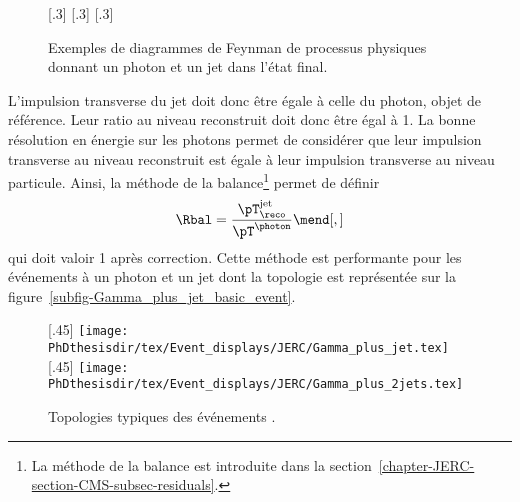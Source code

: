 \begin{figure}[h]
\centering\vspace{\baselineskip}
\subcaptionbox{\label{subfig-fgraph-gq_qGamma_S}}[.3\textwidth]
{\vspace{\baselineskip}}
\hfill
\subcaptionbox{\label{subfig-fgraph-gq_qGamma_T}}[.3\textwidth]
{\vspace{\baselineskip}}
\hfill
\subcaptionbox{\label{subfig-fgraph-qq_gGamma}}[.3\textwidth]
{\vspace{\baselineskip}}
\caption[Diagrammes de Feynman donnant un photon et un jet dans l'état final.]{Exemples de diagrammes de Feynman de processus physiques donnant un photon et un jet dans l'état final.}
\label{fig-fgraph-gamma_plus_jets}
\end{figure}
\par L'impulsion transverse du jet doit donc être égale à celle du photon, objet de référence. Leur ratio au niveau reconstruit doit donc être égal à 1.
La bonne résolution en énergie sur les photons permet de considérer que leur impulsion transverse au niveau reconstruit est égale à leur impulsion transverse au niveau particule.
Ainsi, la méthode de la balance\footnote{La méthode de la balance est introduite dans la section~\ref{chapter-JERC-section-CMS-subsec-residuals}.} permet de définir
\begin{equation}
\Rbal = \frac{\pT_\reco^\text{jet}}{\pT^{\photon}}
\mend[,]
\end{equation}
qui doit valoir 1 après correction.
Cette méthode est performante pour les événements à un photon et un jet dont la topologie est représentée sur la figure~\ref{subfig-Gamma_plus_jet_basic_event}.
\begin{figure}[h]
\centering
{}[.45\textwidth]
{\texttt{[image: \\PhDthesisdir/tex/Event\_displays/JERC/Gamma\_plus\_jet.tex]}}
\hfill
{}[.45\textwidth]
{\texttt{[image: \\PhDthesisdir/tex/Event\_displays/JERC/Gamma\_plus\_2jets.tex]}}
\caption{Topologies typiques des événements \Gjets.}
\label{fig-Gamma_plus_jet_events}
\end{figure}
